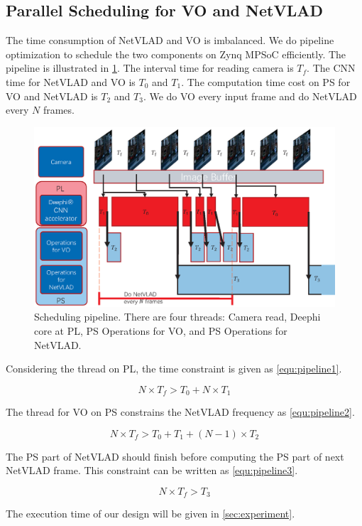 \subsection{Parallel Scheduling for VO and NetVLAD}

The time consumption of NetVLAD and VO is imbalanced. We do pipeline optimization to schedule the two components on Zynq MPSoC efficiently. The pipeline is illustrated in \cref{fig:pipline}. The interval time for reading camera is $T_{f}$. The CNN time for NetVLAD and VO is $T_{0}$ and $T_{1}$. The computation time cost on PS for VO and NetVLAD is $T_{2}$ and $T_{3}$. We do VO every input frame and do NetVLAD every $N$ frames.

\begin{figure}[t]
    \centering  
    \includegraphics[width=0.95\linewidth]{fig/pipeline.eps}
    \caption{Scheduling pipeline. There are four threads: Camera read, Deephi core at PL, PS Operations for VO, and PS Operations for NetVLAD.}
    \label{fig:pipline}
\end{figure}


Considering the thread on PL, the time constraint is given as \cref{equ:pipeline1}. 

\begin{equation}
    N \times T_{f} > T_{0} + N \times T_{1}
    \label{equ:pipeline1}
\end{equation}

The thread for VO on PS constrains the NetVLAD frequency as \cref{equ:pipeline2}.

\begin{equation}
    N \times T_{f} > T_{0} + T_{1} + (N-1) \times T_{2}
    \label{equ:pipeline2}
\end{equation}

The PS part of NetVLAD should finish before computing the PS part of next NetVLAD frame. This constraint can be written as \cref{equ:pipeline3}.


\begin{equation}
    N \times T_{f} > T_{3}
    \label{equ:pipeline3}
\end{equation}

The execution time of our design will be given in \cref{sec:experiment}.